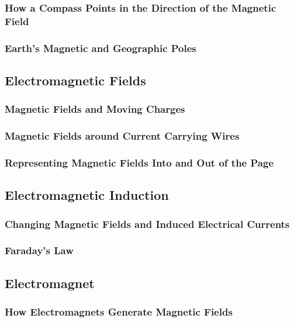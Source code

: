 \documentclass[../main-physics-problems.tex]{subfiles}
\begin{document}
\subsubsection{How a Compass Points in the Direction of the Magnetic Field}

\subsubsection{Earth's Magnetic and Geographic Poles}

\subsection{Electromagnetic Fields}

\subsubsection{Magnetic Fields and Moving Charges}

\subsubsection{Magnetic Fields around Current Carrying Wires}

\subsubsection{Representing Magnetic Fields Into and Out of the Page}

\subsection{Electromagnetic Induction}

\subsubsection{Changing Magnetic Fields and Induced Electrical Currents}

\subsubsection{Faraday's Law}

\clearpage

\subsection{Electromagnet}

\subsubsection{How Electromagnets Generate Magnetic Fields}
\end{document}
